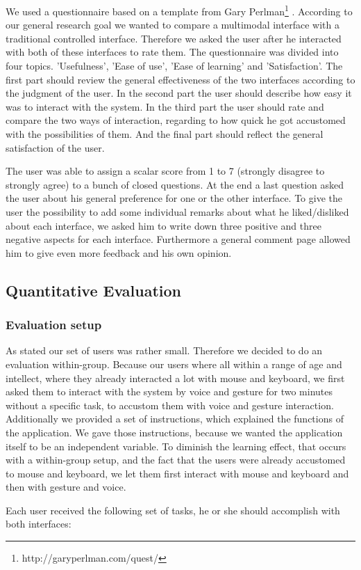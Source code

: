 \documentclass[a4paper, 10pt]{article}
\begin{document}
	\par{We used a questionnaire based on a template from Gary Perlman\footnote{http://garyperlman.com/quest/} . According to our general research goal we wanted to compare a multimodal interface with a traditional controlled interface. Therefore we asked the user after he interacted with both of these interfaces to rate them. The questionnaire was divided into four topics. 'Usefulness', 'Ease of use', 'Ease of learning' and 'Satisfaction'. The first part should review the general effectiveness of the two interfaces according to the judgment of the user. In the second part the user should describe how easy it was to interact with the system. In the third part the user should rate and compare the two ways of interaction, regarding to how quick he got accustomed with the possibilities of them. And the final part should reflect the general satisfaction of the user.}
	\par{The user was able to assign a scalar score from 1 to 7 (strongly disagree to strongly agree) to a bunch of closed questions. At the end a last question asked the user about his general preference for one or the other interface. To give the user the possibility to add some individual remarks about what he liked/disliked about each interface, we asked him to write down three positive and three negative aspects for each interface. Furthermore a general comment page allowed him to give even more feedback and his own opinion.}
	
	\subsection{Quantitative Evaluation}
	
	\subsubsection{Evaluation setup}
	
	\par{As stated our set of users was rather small. Therefore we decided to do an evaluation within-group. Because our users where all within a range of age and intellect, where they already interacted a lot with mouse and keyboard, we first asked them to interact with the system by voice and gesture for two minutes without a specific task, to accustom them with voice and gesture interaction. Additionally we provided a set of instructions, which explained the functions of the application. We gave those instructions, because we wanted the application itself to be an independent variable. To diminish the learning effect, that occurs with a within-group setup, and the fact that the users were already accustomed to mouse and keyboard, we let them first interact with mouse and keyboard and then with gesture and voice.}
	\par{Each user received the following set of tasks, he or she should accomplish with both interfaces:}
	
\end{document}
